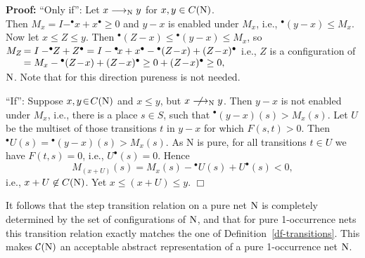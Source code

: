 \documentclass[twocolumn]{article}
\newcommand{\out}[1]{}        \newcommand{\ams}[1]{#1}      \usepackage[preserveurlmacro]{breakurl}
\newenvironment{proof}{\begin{trivlist} \item[\hspace{\labelsep}\bf
Proof:]}{\hfill $\Box$\end{trivlist}}
\newcommand{\df}[1]{Definition~\ref{df-#1}}
\newcommand{\pr}[1]{Proposition~\ref{pr-#1}}
\begin{document}
\begin{proof}``Only if'': Let $x \stackrel{}{\longrightarrow}_{\rm N} y$ for $x,y \in
C({\rm N})$.\\ Then $M_x = I - ^\bullet\!x + x^\bullet \geq 0$ and $y-x$ is
enabled under $M_x$, i.e., $^\bullet (y-x) \leq M_x$. Now let
$x \leq Z \leq y$. Then $^\bullet (Z-x) \leq \mbox{$^\bullet
(y-x)$} \leq M_x$, so\\ $M_Z\,\begin{array}[t]{@{}l@{}}=
 I - ^\bullet\hspace{-2.78995pt}Z + Z^\bullet =  I - \mbox{$^\bullet\!x$} +
 x^\bullet - \mbox{$^\bullet (Z\!-\!x)$} + (Z\!-\!x)^\bullet \\
 =  M_x - \mbox{$^\bullet (Z\!-\!x)$} + (Z\!-\!x)^\bullet \geq 0 +
 (Z\!-\!x)^\bullet  \geq 0,\end{array}$ i.e., $Z$ is a
configuration of ${\rm N}$. Note that for this direction pureness is not needed.

``If'': 
Suppose $x,y\!\in\!C({\rm N})$ and $x\!\leq\!y$, but $x \hspace{4pt}\not\hspace{-4pt} \stackrel{\ }{\longrightarrow}_{\rm N} y$.
Then \mbox{$y-x$} is not enabled under $M_x$, i.e., there is a place
$s\!\in\!S$, such that $^\bullet(y-x)(s) > M_x(s)$. Let $U$ be the multiset of
those transitions $t$ in $y-x$ for which $F(s,t)>0$. Then $^\bullet U(s)
= \mbox{$^\bullet (y-x)$}(s) > M_x(s)$. As N is pure, for all
transitions $t\!\in\!U$ we have $F(t,s)=0$, i.e., $U^\bullet(s)=0$.
Hence $$M_{(x+U)}(s) = M_x(s) - \mbox{$^\bullet U$}(s) + U^\bullet(s) <
0,$$ i.e., $x+U \not\in C({\rm N})$. Yet $x \leq (x+U) \leq y$.
\end{proof}
It follows that the step transition relation on a pure net ${\rm N}$ is
\pagebreak[2]
completely determined by the set of configurations of ${\rm N}$, and that
for pure 1-occurrence nets this transition relation exactly matches
the one of \df{transitions}.  This makes ${\cal C}({\rm N})$ an acceptable
abstract representation of a pure 1-occurrence net ${\rm N}$.

\out{ Moreover, the transition relation of \df{transitions}
 generalises verbatim to multiset systems (reading $\leq$ for
 $\subseteq$ and $<$ for $\subseteq$), and by \pr{transitions-PN} this
 generalised transition relation exactly matches the one on pure Petri nets.
}
\end{document}
